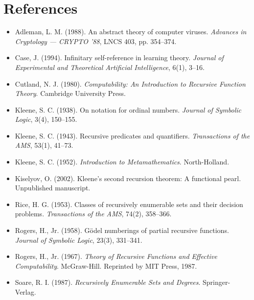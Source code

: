 \section{References}

\begin{itemize}
  \item Adleman, L. M. (1988). An abstract theory of computer viruses. \textit{Advances in Cryptology --- CRYPTO '88}, LNCS 403, pp. 354--374.
  \item Case, J. (1994). Infinitary self-reference in learning theory. \textit{Journal of Experimental and Theoretical Artificial Intelligence}, 6(1), 3--16.
  \item Cutland, N. J. (1980). \textit{Computability: An Introduction to Recursive Function Theory}. Cambridge University Press.
  \item Kleene, S. C. (1938). On notation for ordinal numbers. \textit{Journal of Symbolic Logic}, 3(4), 150--155.
  \item Kleene, S. C. (1943). Recursive predicates and quantifiers. \textit{Transactions of the AMS}, 53(1), 41--73.
  \item Kleene, S. C. (1952). \textit{Introduction to Metamathematics}. North-Holland.
  \item Kiselyov, O. (2002). Kleene's second recursion theorem: A functional pearl. Unpublished manuscript.
  \item Rice, H. G. (1953). Classes of recursively enumerable sets and their decision problems. \textit{Transactions of the AMS}, 74(2), 358--366.
  \item Rogers, H., Jr. (1958). Gödel numberings of partial recursive functions. \textit{Journal of Symbolic Logic}, 23(3), 331--341.
  \item Rogers, H., Jr. (1967). \textit{Theory of Recursive Functions and Effective Computability}. McGraw-Hill. Reprinted by MIT Press, 1987.
  \item Soare, R. I. (1987). \textit{Recursively Enumerable Sets and Degrees}. Springer-Verlag.
\end{itemize}
